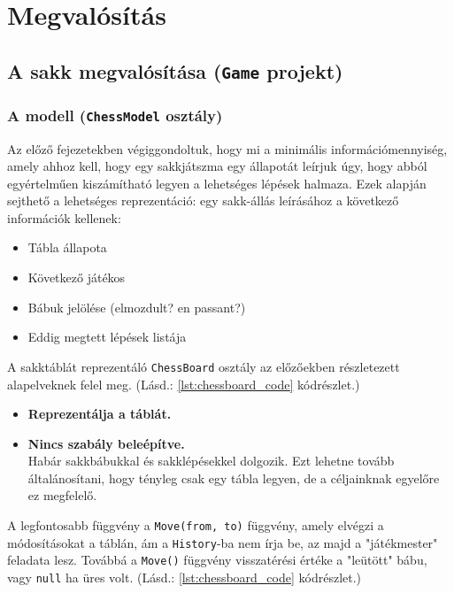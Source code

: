\documentclass[twoside, a4paper, 12pt]{article}
\begin{document}
\newpage
\section{Megvalósítás}
\subsection{A sakk megvalósítása (\texttt{Game} projekt)}
\subsubsection{A modell (\texttt{ChessModel} osztály)}
Az előző fejezetekben végiggondoltuk, hogy mi a minimális információmennyiség, amely ahhoz kell, hogy egy sakkjátszma egy állapotát leírjuk úgy, hogy abból egyértelműen kiszámítható legyen a lehetséges lépések halmaza. Ezek alapján sejthető a lehetséges reprezentáció: egy sakk-állás leírásához a következő információk kellenek:
\begin{itemize}
	\item Tábla állapota
	\item Következő játékos
	\item Bábuk jelölése (elmozdult? en passant?)
	\item Eddig megtett lépések listája
\end{itemize}


A sakktáblát reprezentáló \texttt{ChessBoard} osztály az előzőekben részletezett alapelveknek felel meg. (Lásd.: \ref{lst:chessboard_code} kódrészlet.)
\begin{itemize}
	\item \textbf{Reprezentálja a táblát.}
	\item \textbf{Nincs szabály beleépítve.} \\ 
	Habár sakkbábukkal és sakklépésekkel dolgozik. Ezt lehetne tovább általánosítani, hogy tényleg csak egy tábla legyen, de a céljainknak egyelőre ez megfelelő.
\end{itemize}

A legfontosabb függvény a \texttt{Move(from, to)} függvény, amely elvégzi a módosításokat a táblán, ám a \texttt{History}-ba nem írja be, az majd a "játékmester" feladata lesz. Továbbá a \texttt{Move()} függvény visszatérési értéke a "leütött" bábu, vagy \texttt{null} ha üres volt. (Lásd.: \ref{lst:chessboard_code} kódrészlet.)
\end{document}
